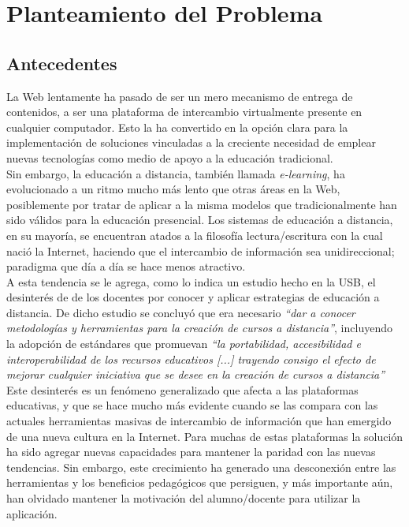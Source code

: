 \chapter{Planteamiento del Problema}
\section{Antecedentes}
La Web lentamente ha pasado de ser un mero mecanismo de entrega de contenidos, a ser una plataforma de intercambio virtualmente presente en cualquier computador. Esto la ha convertido en la opción clara para la implementación de soluciones vinculadas a la creciente necesidad de emplear nuevas tecnologías como medio de apoyo a la educación tradicional.\\

Sin embargo, la educación a distancia, también llamada \emph{e-learning}, ha evolucionado a un ritmo mucho más lento que otras áreas en la Web, posiblemente por tratar de aplicar a la misma modelos que tradicionalmente han sido válidos para la educación presencial. Los sistemas de educación a distancia, en su mayoría, se encuentran atados a la filosofía lectura/escritura con la cual nació la Internet, haciendo que el intercambio de información sea unidireccional; paradigma que día a día se hace menos atractivo.\\

A esta tendencia se le agrega, como lo indica un estudio hecho en la USB, el desinterés de de los docentes por conocer y aplicar estrategias de educación a distancia. De dicho estudio se concluyó que era necesario \emph{``dar a conocer metodologías y herramientas para la creación de cursos a distancia''}, incluyendo la adopción de estándares que promuevan \emph{``la portabilidad, accesibilidad e interoperabilidad de los recursos educativos [...] trayendo consigo el efecto de mejorar cualquier iniciativa que se desee en la creación de cursos a distancia''} \citep{Diaz2007}\\

Este desinterés es un fenómeno generalizado que afecta a las plataformas educativas, y que se hace mucho más evidente cuando se las  compara con las actuales herramientas masivas de intercambio de información que han emergido de una nueva cultura en la Internet. Para muchas de estas plataformas la solución ha sido agregar nuevas capacidades para mantener la paridad con las nuevas tendencias. Sin embargo, este crecimiento ha generado una desconexión entre las herramientas y los beneficios pedagógicos que persiguen, y más importante aún, han olvidado mantener la motivación del alumno/docente para utilizar la aplicación.

